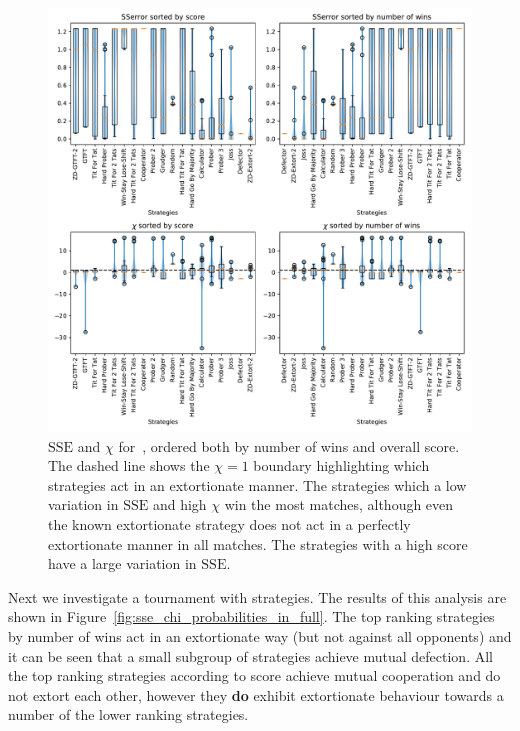 \documentclass[a4paper]{article}
\newcommand{\SSe}{\text{SSE}}
\begin{document}
\begin{figure}[!htbp]
    \centering
    \includegraphics[width=.8\textwidth]{./assets/img/sserror_in_stewart_plotkin/main.pdf}
    \caption{\(\SSe\) and \(\chi\) for~\cite{Stewart2012},
        ordered both by number of wins and overall score. The dashed line shows
        the \(\chi=1\) boundary highlighting which strategies act in an
        extortionate manner. The strategies which a low variation in
        \(\SSe\) and high \(\chi\) win the most matches, although even the known
        extortionate strategy does not act in a perfectly extortionate manner in
        all matches. The strategies with a high score have a large variation in
        \(\SSe\).
        }
    \label{fig:sserror_in_stewart_plotkin}
\end{figure}

Next we investigate a tournament with strategies. The
results of this analysis are shown in
Figure~\ref{fig:sse_chi_probabilities_in_full}. The top ranking strategies
by number of wins act in an extortionate way (but not against all opponents) and
it can be seen that a small subgroup of strategies achieve mutual defection.
All the top ranking strategies according to score achieve mutual cooperation and
do not extort each other, however they \textbf{do} exhibit extortionate
behaviour towards a number of the lower ranking strategies.
\end{document}
